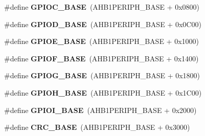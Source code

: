 \begin{DoxyCompactItemize}
\item 
\hypertarget{group___peripheral__memory__map_ga26f267dc35338eef219544c51f1e6b3f}{\#define {\bfseries G\-P\-I\-O\-C\-\_\-\-B\-A\-S\-E}~(A\-H\-B1\-P\-E\-R\-I\-P\-H\-\_\-\-B\-A\-S\-E + 0x0800)}\label{group___peripheral__memory__map_ga26f267dc35338eef219544c51f1e6b3f}

\item 
\hypertarget{group___peripheral__memory__map_ga1a93ab27129f04064089616910c296ec}{\#define {\bfseries G\-P\-I\-O\-D\-\_\-\-B\-A\-S\-E}~(A\-H\-B1\-P\-E\-R\-I\-P\-H\-\_\-\-B\-A\-S\-E + 0x0\-C00)}\label{group___peripheral__memory__map_ga1a93ab27129f04064089616910c296ec}

\item 
\hypertarget{group___peripheral__memory__map_gab487b1983d936c4fee3e9e88b95aad9d}{\#define {\bfseries G\-P\-I\-O\-E\-\_\-\-B\-A\-S\-E}~(A\-H\-B1\-P\-E\-R\-I\-P\-H\-\_\-\-B\-A\-S\-E + 0x1000)}\label{group___peripheral__memory__map_gab487b1983d936c4fee3e9e88b95aad9d}

\item 
\hypertarget{group___peripheral__memory__map_ga7f9a3f4223a1a784af464a114978d26e}{\#define {\bfseries G\-P\-I\-O\-F\-\_\-\-B\-A\-S\-E}~(A\-H\-B1\-P\-E\-R\-I\-P\-H\-\_\-\-B\-A\-S\-E + 0x1400)}\label{group___peripheral__memory__map_ga7f9a3f4223a1a784af464a114978d26e}

\item 
\hypertarget{group___peripheral__memory__map_ga5d8ca4020f2e8c00bde974e8e7c13cfe}{\#define {\bfseries G\-P\-I\-O\-G\-\_\-\-B\-A\-S\-E}~(A\-H\-B1\-P\-E\-R\-I\-P\-H\-\_\-\-B\-A\-S\-E + 0x1800)}\label{group___peripheral__memory__map_ga5d8ca4020f2e8c00bde974e8e7c13cfe}

\item 
\hypertarget{group___peripheral__memory__map_gaee4716389f3a1c727495375b76645608}{\#define {\bfseries G\-P\-I\-O\-H\-\_\-\-B\-A\-S\-E}~(A\-H\-B1\-P\-E\-R\-I\-P\-H\-\_\-\-B\-A\-S\-E + 0x1\-C00)}\label{group___peripheral__memory__map_gaee4716389f3a1c727495375b76645608}

\item 
\hypertarget{group___peripheral__memory__map_ga50acf918c2e1c4597d5ccfe25eb3ad3d}{\#define {\bfseries G\-P\-I\-O\-I\-\_\-\-B\-A\-S\-E}~(A\-H\-B1\-P\-E\-R\-I\-P\-H\-\_\-\-B\-A\-S\-E + 0x2000)}\label{group___peripheral__memory__map_ga50acf918c2e1c4597d5ccfe25eb3ad3d}

\item 
\hypertarget{group___peripheral__memory__map_ga656a447589e785594cbf2f45c835ad7e}{\#define {\bfseries C\-R\-C\-\_\-\-B\-A\-S\-E}~(A\-H\-B1\-P\-E\-R\-I\-P\-H\-\_\-\-B\-A\-S\-E + 0x3000)}\label{group___peripheral__memory__map_ga656a447589e785594cbf2f45c835ad7e}


\end{DoxyCompactItemize}
